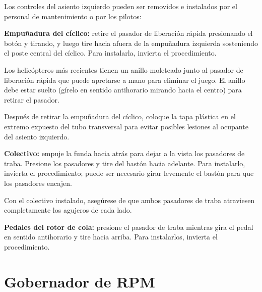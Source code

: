 Los controles del asiento izquierdo pueden ser removidos e instalados por el personal de mantenimiento o por los pilotos:

\begin{pasos}
\item \textbf{Empuñadura del cíclico:} retire el pasador de liberación rápida presionando el botón y tirando, y luego tire hacia afuera de la empuñadura izquierda sosteniendo el poste central del cíclico. Para instalarla, invierta el procedimiento.
\end{pasos}

\begin{nota}
Los helicópteros más recientes tienen un anillo moleteado junto al pasador de liberación rápida que puede apretarse a mano para eliminar el juego. El anillo debe estar suelto (gírelo en sentido antihorario mirando hacia el centro) para retirar el pasador.
\end{nota}

\begin{precaucion}
Después de retirar la empuñadura del cíclico, coloque la tapa plástica en el extremo expuesto del tubo transversal para evitar posibles lesiones al ocupante del asiento izquierdo.
\end{precaucion}

\begin{pasos}
\setcounter{enumi}{1}
\item \textbf{Colectivo:} empuje la funda hacia atrás para dejar a la vista los pasadores de traba. Presione los pasadores y tire del bastón hacia adelante. Para instalarlo, invierta el procedimiento; puede ser necesario girar levemente el bastón para que los pasadores encajen.
\end{pasos}

\begin{precaucion}
Con el colectivo instalado, asegúrese de que ambos pasadores de traba atraviesen completamente los agujeros de cada lado.
\end{precaucion}

\begin{pasos}
\setcounter{enumi}{2}
\item \textbf{Pedales del rotor de cola:} presione el pasador de traba mientras gira el pedal en sentido antihorario y tire hacia arriba. Para instalarlos, invierta el procedimiento.
\end{pasos}

\section{Gobernador de RPM}

